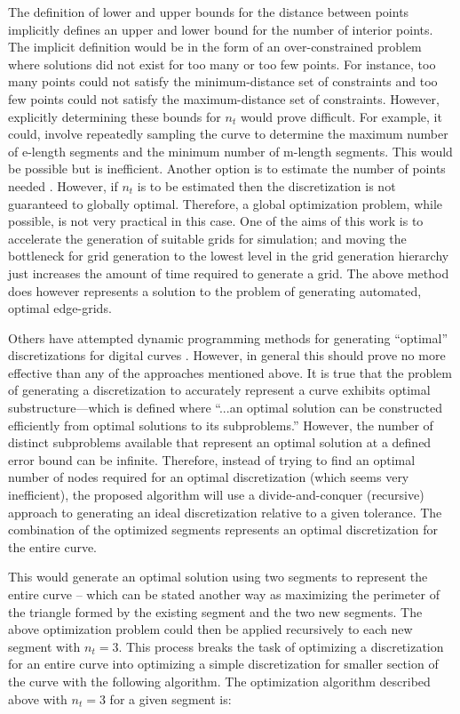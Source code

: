 The definition of lower and upper bounds for the distance between points 
implicitly defines an upper and lower bound for the number of interior 
points. The implicit definition would be in the form of an 
over-constrained problem where solutions did not exist for too many or too 
few points. For instance, too many points could not satisfy the 
minimum-distance set of constraints and too few points could not satisfy 
the maximum-distance set of constraints. However, explicitly determining 
these bounds for $n_t$ would prove difficult. For example, it could, 
involve repeatedly sampling the curve to determine the maximum number of 
e-length segments and the minimum number of m-length segments. This would 
be possible but is inefficient. Another option is to estimate the number 
of points needed \cite{cuilliere97}. However, if $n_t$ is to be estimated 
then the discretization is not guaranteed to globally optimal. Therefore, 
a global optimization problem, while possible, is not 
very practical in this case. One of the aims of this work is to 
accelerate the generation of suitable grids for simulation; and moving the 
bottleneck for grid generation to the lowest level in the grid generation 
hierarchy just increases the amount of time required to generate a grid. 
The above method does however represents a solution to the problem of 
generating automated, optimal edge-grids.

Others have attempted dynamic programming methods for generating ``optimal'' discretizations for digital curves \cite{horng02}. However, in general this should prove no more effective than any of the approaches mentioned above. It is true that the problem of generating a discretization to accurately represent a curve exhibits optimal substructure—which is defined where ``...an optimal solution can be constructed efficiently from optimal solutions to its subproblems.'' \cite{cormen01} However, the number of distinct subproblems available that represent an optimal solution at a defined error bound can be infinite. Therefore, instead of trying to find an optimal number of nodes required for an optimal discretization (which seems very inefficient), the proposed algorithm will use a divide-and-conquer (recursive) approach to generating an ideal discretization relative to a given tolerance. The combination of the optimized segments represents an optimal discretization for the entire curve.

This would generate an optimal solution using two segments to represent the entire curve -- which can be stated another way as maximizing the perimeter of the triangle formed by the existing segment and the two new segments. The above optimization problem could then be applied recursively to each new segment with $n_t=3$. This process breaks the task of optimizing a discretization for an entire curve into optimizing a simple discretization for smaller section of the curve with the following algorithm. The optimization algorithm described above with $n_t=3$ for a given segment is:

